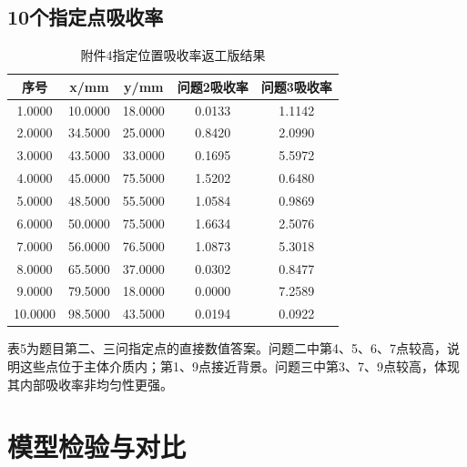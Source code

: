 \documentclass[UTF8,a4paper,12pt]{ctexart}
\begin{document}
\subsection{10个指定点吸收率}
\begin{table}[H]\centering\caption{附件4指定位置吸收率返工版结果}\begin{tabular}{ccccc}
\toprule
序号 & x/mm & y/mm & 问题2吸收率 & 问题3吸收率 \\
\midrule
1.0000 & 10.0000 & 18.0000 & 0.0133 & 1.1142 \\
2.0000 & 34.5000 & 25.0000 & 0.8420 & 2.0990 \\
3.0000 & 43.5000 & 33.0000 & 0.1695 & 5.5972 \\
4.0000 & 45.0000 & 75.5000 & 1.5202 & 0.6480 \\
5.0000 & 48.5000 & 55.5000 & 1.0584 & 0.9869 \\
6.0000 & 50.0000 & 75.5000 & 1.6634 & 2.5076 \\
7.0000 & 56.0000 & 76.5000 & 1.0873 & 5.3018 \\
8.0000 & 65.5000 & 37.0000 & 0.0302 & 0.8477 \\
9.0000 & 79.5000 & 18.0000 & 0.0000 & 7.2589 \\
10.0000 & 98.5000 & 43.5000 & 0.0194 & 0.0922 \\
\bottomrule
\end{tabular}\end{table}
表5为题目第二、三问指定点的直接数值答案。问题二中第4、5、6、7点较高，说明这些点位于主体介质内；第1、9点接近背景。问题三中第3、7、9点较高，体现其内部吸收率非均匀性更强。

\section{模型检验与对比}
\end{document}
